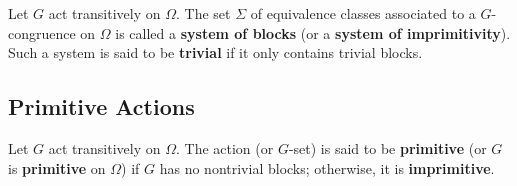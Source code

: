 \begin{definition}
	Let $G$ act transitively on $\Omega$. The set $\Sigma$ of equivalence classes associated to a $G$-congruence on $\Omega$ is called a \textbf{system of blocks} (or a \textbf{system of imprimitivity}). Such a system is said to be \textbf{trivial} if it only contains trivial blocks.
\end{definition}

\subsection{Primitive Actions}

\begin{definition}
	Let $G$ act transitively on $\Omega$. The action (or $G$-set) is said to be \textbf{primitive} (or $G$ is \textbf{primitive} on $\Omega$) if $G$ has no nontrivial blocks; otherwise, it is \textbf{imprimitive}.
\end{definition}

